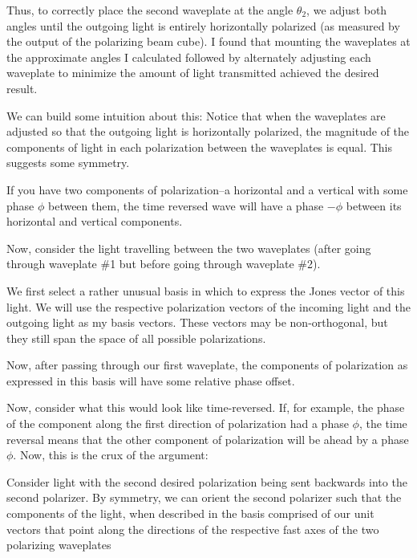 Thus, to correctly place the second waveplate at the angle  $\theta_2$, we adjust both angles until the outgoing light is entirely horizontally polarized (as measured by the output of the polarizing beam cube). I found that mounting the waveplates at the approximate angles I calculated followed by alternately adjusting each waveplate to minimize the amount of light transmitted achieved the desired result. 

We can build some intuition about this: Notice that when the waveplates are adjusted so that the outgoing light is horizontally polarized, the magnitude of the components of light in each polarization between the waveplates is equal. This suggests some symmetry. 


If you have two components of polarization--a horizontal and a vertical with some phase $\phi$ between them, the time reversed wave will have a phase $-\phi$ between its horizontal and vertical components. 

Now, consider the light travelling between the two waveplates (after going through waveplate \#1 but before going through waveplate \#2). 

We first select a rather unusual basis in which to express the Jones vector of this light. We will use the respective polarization vectors of the incoming light and the outgoing light as my basis vectors. These vectors may be non-orthogonal, but they still span the space of all possible polarizations.  

Now, after passing through our first waveplate, the components of polarization as expressed in this basis will have some relative phase offset. 

Now, consider what this would look like time-reversed. If, for example, the phase of the component along the first direction of polarization had a phase $\phi$, the time reversal means that the other component of polarization will be ahead by a phase $\phi$. Now, this is the crux of the argument: 

Consider light with the second desired polarization being sent backwards into the second polarizer. By symmetry, we can orient the second polarizer such that the components of the light, when described in the basis comprised of our unit vectors that point along the directions of the respective fast axes of the two polarizing waveplates 

